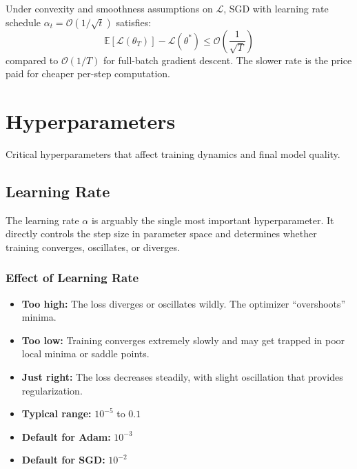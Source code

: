 \begin{theorem}
Under convexity and smoothness assumptions on $\mathcal{L}$, SGD with learning rate schedule $\alpha_t = \mathcal{O}(1/\sqrt{t})$ satisfies:
\begin{equation}
\mathbb{E}[\mathcal{L}(\theta_T)] - \mathcal{L}(\theta^*) \leq \mathcal{O}\!\left(\frac{1}{\sqrt{T}}\right)
\end{equation}
compared to $\mathcal{O}(1/T)$ for full-batch gradient descent. The slower rate is the price paid for cheaper per-step computation.
\end{theorem}

\section{Hyperparameters}

Critical hyperparameters that affect training dynamics and final model quality.

\subsection{Learning Rate}

The learning rate $\alpha$ is arguably the single most important hyperparameter. It directly controls the step size in parameter space and determines whether training converges, oscillates, or diverges.

\subsubsection{Effect of Learning Rate}

\begin{itemize}
    \item \textbf{Too high:} The loss diverges or oscillates wildly. The optimizer ``overshoots'' minima.
    \item \textbf{Too low:} Training converges extremely slowly and may get trapped in poor local minima or saddle points.
    \item \textbf{Just right:} The loss decreases steadily, with slight oscillation that provides regularization.
    \item \textbf{Typical range:} $10^{-5}$ to $0.1$
    \item \textbf{Default for Adam:} $10^{-3}$
    \item \textbf{Default for SGD:} $10^{-2}$
\end{itemize}


